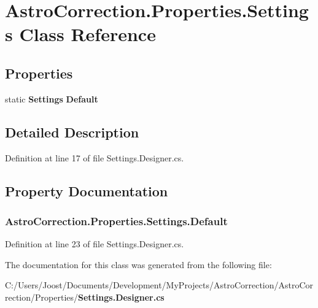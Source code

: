 \section{AstroCorrection.Properties.Settings Class Reference}
\label{class_astro_correction_1_1_properties_1_1_settings}
\subsection*{Properties}
\begin{DoxyCompactItemize}
\item 
static {\bf Settings} {\bf Default}\hspace{0.3cm}{\ttfamily  [get]}
\end{DoxyCompactItemize}


\subsection{Detailed Description}


Definition at line 17 of file Settings.Designer.cs.

\subsection{Property Documentation}
\subsubsection[{Default}]{ AstroCorrection.Properties.Settings.Default\hspace{0.3cm}{\ttfamily  [static, get]}}\label{class_astro_correction_1_1_properties_1_1_settings_a601b0a6c459a91ead39972a5873d042c}


Definition at line 23 of file Settings.Designer.cs.

The documentation for this class was generated from the following file:\begin{DoxyCompactItemize}
\item 
C:/Users/Joost/Documents/Development/MyProjects/AstroCorrection/AstroCorrection/Properties/{\bf Settings.Designer.cs}\end{DoxyCompactItemize}
